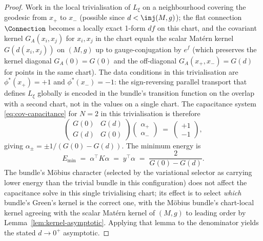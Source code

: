 \begin{proof}
Work in the local trivialisation of $L_\xi$ on a neighbourhood
covering the geodesic from $x_+$ to $x_-$ (possible since
$d<\inj(M,g)$); the flat connection $\Connection$ becomes a locally
exact 1-form $df$ on this chart, and the covariant kernel
$G_A(x_i,x_j)$ for $x_i,x_j$ in the chart equals the scalar Mat\'ern
kernel $G(d(x_i,x_j))$ on $(M,g)$ up to gauge-conjugation by $e^f$
(which preserves the kernel diagonal $G_A(0)=G(0)$ and the off-diagonal
$G_A(x_+,x_-)=G(d)$ for points in the same chart). The data
conditions in this trivialisation are $\phi^*(x_+)=+1$ and
$\phi^*(x_-)=-1$: the sign-reversing parallel transport that defines
$L_\xi$ globally is encoded in the bundle's transition function on
the overlap with a second chart, not in the values on a single chart.
The capacitance system \eqref{eq:cov-capacitance} for $N=2$ in this
trivialisation is therefore
\[
   \begin{pmatrix} G(0) & G(d) \\ G(d) & G(0) \end{pmatrix}
   \begin{pmatrix}\alpha_+\\\alpha_-\end{pmatrix}
   \;=\; \begin{pmatrix}+1\\-1\end{pmatrix},
\]
giving $\alpha_\pm=\pm 1/(G(0)-G(d))$. The minimum energy is
\[
   E_{\min} \;=\; \alpha^\top K\alpha
   \;=\; y^\top\alpha
   \;=\; \frac{2}{G(0)-G(d)}.
\]
The bundle's M\"obius character (selected by the variational
selector as carrying lower energy than the trivial bundle in this
configuration) does not affect the capacitance solve in this single
trivialising chart; its effect is to select \emph{which} bundle's
Green's kernel is the correct one, with the M\"obius bundle's
chart-local kernel agreeing with the scalar Mat\'ern kernel of
$(M,g)$ to leading order by Lemma~\ref{lem:kernel-asymptotic}.
Applying that lemma to the denominator yields the stated $d\to 0^+$
asymptotic.
\end{proof}

